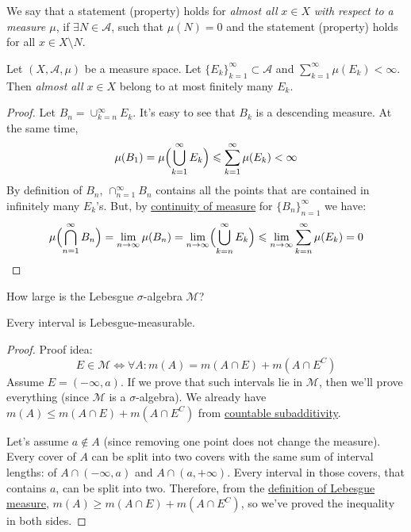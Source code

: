 \begin{definition}
    We say that a statement (property) holds for \textit{almost all} $x \in X$
    \textit{with respect to a measure $\mu$}, if
    $\exists N \in \mathcal{A}$, such that $\mu(N) = 0$ and the statement (property)
    holds for all $x \in X \setminus N$.
\end{definition}
\begin{lemma}
    Let $(X, \mathcal{A}, \mu)$ be a measure space. Let
    $\{E_k\}_{k=1}^\infty \subset \mathcal{A}$ and $\sum_{k=1}^\infty \mu(E_k) < \infty$.
    Then \textit{almost all} $x \in X$ belong to at most finitely many $E_k$.
\end{lemma}
\begin{proof}
    Let $B_n = \cup_{k=n}^\infty E_k$. It's easy to see that $B_k$ is a descending measure.
    At the same time,
    \[ \mu(B_1) = \mu\Bigl(\bigcup_{k=1}^\infty E_k\Bigr) \le \sum_{k=1}^\infty \mu(E_k) < \infty \]
    By definition of $B_n$, $\cap_{n=1}^\infty B_n$ contains all the points
    that are contained in infinitely many $E_k$'s. But, by \hyperref[the:continuityOfMeasure]{continuity of measure} 
    for $\{B_n\}_{n=1}^\infty$ we have:
    \[ 
        \mu\Bigl(\bigcap_{n=1}^\infty B_n\Bigr) =
        \lim_{n \to \infty} \mu(B_n) =
        \lim_{n \to \infty} \Bigl(\bigcup_{k=n}^\infty E_k\Bigr) \le
        \lim_{n \to \infty} \sum_{k=n}^\infty \mu(E_k) = 0
    \]
\end{proof}

How large is the Lebesgue $\sigma$-algebra $\mathcal{M}$?
\begin{proposition}
    \label{prop:intervalsAreMeasurable}
    Every interval is Lebesgue-measurable.
\end{proposition}
\begin{proof}
    Proof idea:
    \[ 
        E \in \mathcal{M} \Longleftrightarrow 
        \forall A: m(A) = m(A \cap E) + m(A \cap E^C)
    \]
    Assume $E = (-\infty, a)$. If we prove that such intervals lie in $\mathcal{M}$, 
    then we'll prove everything (since $\mathcal{M}$ is a $\sigma$-algebra).
    We already have $m(A) \le m(A \cap E) + m(A \cap E^C)$ from \hyperref[the:countableSubadditivity]{countable subadditivity}.

    Let's assume $a \not\in A$ (since removing one point does not change the measure).
    Every cover of $A$ can be split into two covers with the same sum of interval lengths: of
    $A \cap (-\infty, a)$ and $A \cap (a, +\infty)$. Every interval in those
    covers, that contains $a$, can be split into two. Therefore,
    from the \hyperref[def:lebesgueOuterMeasure]{definition of Lebesgue measure}, 
    $m(A) \ge m(A \cap E) + m(A \cap E^C)$, so we've proved the inequality in both sides.
\end{proof}